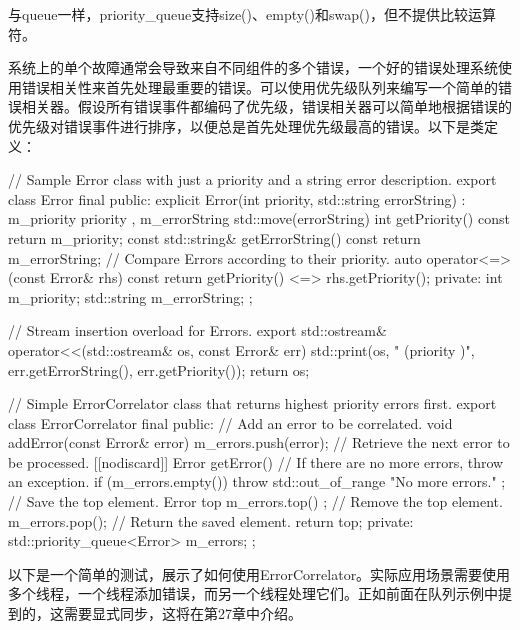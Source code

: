 与queue一样，priority\_queue支持size()、empty()和swap()，但不提供比较运算符。


系统上的单个故障通常会导致来自不同组件的多个错误，一个好的错误处理系统使用错误相关性来首先处理最重要的错误。可以使用优先级队列来编写一个简单的错误相关器。假设所有错误事件都编码了优先级，错误相关器可以简单地根据错误的优先级对错误事件进行排序，以便总是首先处理优先级最高的错误。以下是类定义：

\begin{cpp}
// Sample Error class with just a priority and a string error description.
export class Error final
{
    public:
        explicit Error(int priority, std::string errorString)
            : m_priority { priority }, m_errorString { std::move(errorString) } { }
        int getPriority() const { return m_priority; }
        const std::string& getErrorString() const { return m_errorString; }
        // Compare Errors according to their priority.
        auto operator<=>(const Error& rhs) const {
            return getPriority() <=> rhs.getPriority(); }
    private:
        int m_priority;
        std::string m_errorString;
};

// Stream insertion overload for Errors.
export std::ostream& operator<<(std::ostream& os, const Error& err)
{
    std::print(os, "{} (priority {})", err.getErrorString(), err.getPriority());
    return os;
}

// Simple ErrorCorrelator class that returns highest priority errors first.
export class ErrorCorrelator final
{
    public:
        // Add an error to be correlated.
        void addError(const Error& error) { m_errors.push(error); }
        // Retrieve the next error to be processed.
        [[nodiscard]] Error getError()
        {
            // If there are no more errors, throw an exception.
            if (m_errors.empty()) {
                throw std::out_of_range { "No more errors." };
            }
            // Save the top element.
            Error top { m_errors.top() };
            // Remove the top element.
            m_errors.pop();
            // Return the saved element.
            return top;
        }
    private:
        std::priority_queue<Error> m_errors;
};
\end{cpp}

以下是一个简单的测试，展示了如何使用ErrorCorrelator。实际应用场景需要使用多个线程，一个线程添加错误，而另一个线程处理它们。正如前面在队列示例中提到的，这需要显式同步，这将在第27章中介绍。

